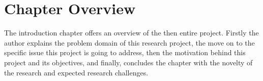 \section{Chapter Overview}

The introduction chapter offers an overview of the then entire project. Firstly the author explains the problem domain of this research project, the move on to the specific issue this project is going to address, then the motivation behind this project and its objectives, and finally, concludes the chapter with the novelty of the research and expected research challenges.